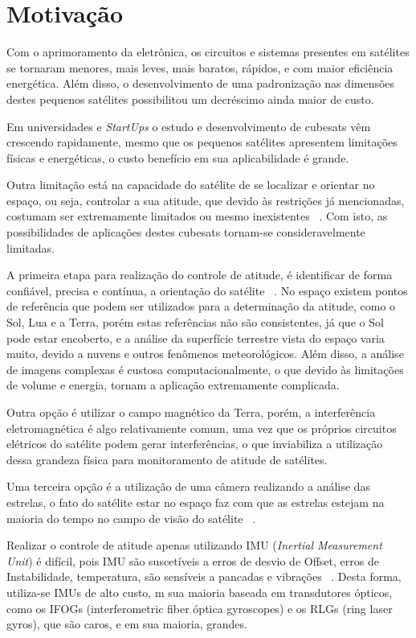 \section{Motivação}
\label{sec:Introducao_motivacao}
Com o aprimoramento da eletrônica, os circuitos e sistemas presentes em satélites se tornaram menores, mais leves, mais baratos, rápidos, e com maior eficiência  energética. Além disso, o desenvolvimento de uma padronização nas dimensões destes pequenos satélites possibilitou um decréscimo ainda maior de custo.

Em universidades e  \textit{StartUps} o estudo e desenvolvimento de cubesats vêm crescendo rapidamente, mesmo que os pequenos satélites apresentem limitações físicas e energéticas, o custo benefício em sua aplicabilidade é grande.

Outra limitação está na capacidade do satélite de se localizar e orientar no espaço, ou seja, controlar a sua atitude, que devido às restrições já mencionadas, costumam ser extremamente limitados ou mesmo inexistentes ~\cite[]{Diaz}. Com isto, as possibilidades de aplicações destes cubesats tornam-se consideravelmente limitadas.

A primeira etapa para realização do controle de atitude, é identificar de forma confiável, precisa e contínua, 
a orientação do satélite ~\cite[]{Diaz}. No espaço existem pontos de referência que podem ser utilizados para a determinação da atitude, como o Sol, Lua e a Terra, porém estas referências não são consistentes, já que o Sol pode estar encoberto, e a análise da superfície terrestre vista do espaço varia muito, devido a nuvens e outros fenômenos meteorológicos. Além disso, a análise de imagens complexas é custosa computacionalmente, o que devido às limitações de volume e energia, tornam a aplicação extremamente complicada.

Outra opção é utilizar o campo magnético da Terra, porém, a interferência eletromagnética é algo relativamente comum, 
uma vez que os próprios circuitos elétricos do satélite podem gerar interferências, 
o que inviabiliza a utilização dessa grandeza física para monitoramento de atitude de satélites.

Uma terceira opção é a utilização de uma câmera realizando a análise das estrelas, o fato do satélite estar no espaço faz com que as estrelas estejam na maioria do tempo no campo de visão do satélite ~\cite[]{Tappe}.

Realizar o controle de atitude apenas utilizando IMU (\textit{Inertial Measurement Unit})  é difícil, pois IMU são suscetíveis a erros de desvio de Offset, erros de Instabilidade, temperatura, são sensíveis a pancadas e vibrações ~\cite[]{Young}. 
Desta forma, utiliza-se IMUs de alto custo, m sua maioria baseada em transdutores ópticos, como os IFOGs (interferometric fiber óptica gyroscopes) e os RLGs (ring laser gyros), 
que são caros, e em sua maioria, grandes. 

